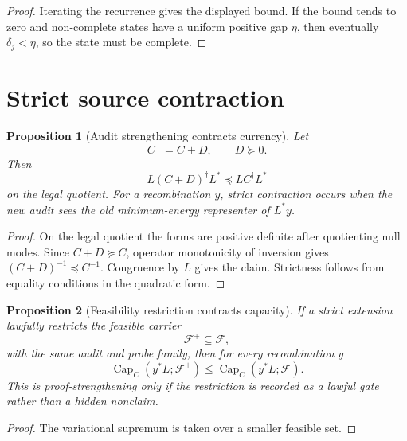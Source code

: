 \documentclass[11pt]{article}
\newtheorem{proposition}{Proposition}
\newcommand{\Loew}{\preceq}
\DeclareMathOperator{\Capacity}{Cap}
\begin{document}
\begin{proof}
Iterating the recurrence gives the displayed bound.  If the bound tends to zero and non-complete states have a uniform positive gap \(\eta\), then eventually \(\delta_j<\eta\), so the state must be complete.
\end{proof}

\section{Strict source contraction}
\begin{proposition}[Audit strengthening contracts currency]
Let
\[
  C^+=C+D,
  \qquad D\succeq0.
\]
Then
\[
  L(C+D)^\dagger L^*\Loew LC^\dagger L^*
\]
on the legal quotient.  For a recombination \(y\), strict contraction occurs when the new audit sees the old minimum-energy representer of \(L^*y\).
\end{proposition}

\begin{proof}
On the legal quotient the forms are positive definite after quotienting null modes.  Since \(C+D\succeq C\), operator monotonicity of inversion gives \((C+D)^{-1}\preceq C^{-1}\).  Congruence by \(L\) gives the claim.  Strictness follows from equality conditions in the quadratic form.
\end{proof}

\begin{proposition}[Feasibility restriction contracts capacity]
If a strict extension lawfully restricts the feasible carrier
\[
  \mathcal F^+\subseteq \mathcal F,
\]
with the same audit and probe family, then for every recombination \(y\)
\[
  \Capacity_C(y^*L;\mathcal F^+)\le \Capacity_C(y^*L;\mathcal F).
\]
This is proof-strengthening only if the restriction is recorded as a lawful gate rather than a hidden nonclaim.
\end{proposition}

\begin{proof}
The variational supremum is taken over a smaller feasible set.
\end{proof}
\end{document}
